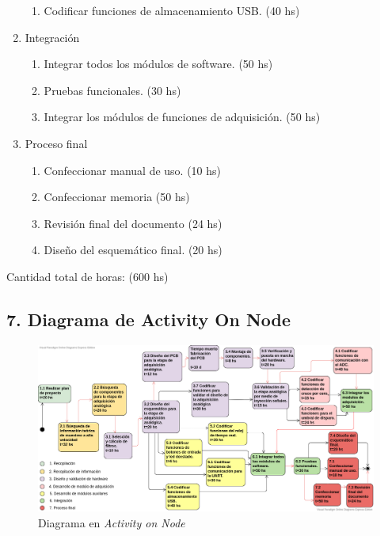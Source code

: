 \documentclass[11pt]{charter}
\begin{document}
\begin{enumerate}
\begin{enumerate}
	\item Codificar funciones de almacenamiento USB. (40 hs)
	\end{enumerate}
\item Integración
	\begin{enumerate}
	\item Integrar todos los módulos de software. (50 hs) 	
	\item Pruebas funcionales.	(30 hs)
	\item Integrar los módulos de funciones de adquisición. (50 hs)
	\end{enumerate}
\item Proceso final
	\begin{enumerate}
	\item Confeccionar manual de uso. (10 hs) 	
	\item Confeccionar memoria (50 hs)
	\item Revisión final del documento (24 hs)
	\item Diseño del esquemático final.	(20 hs)
	\end{enumerate}
\end{enumerate}

Cantidad total de horas: (600 hs)


\begin{landscape}

\section{7. Diagrama de Activity On Node}
\label{sec:AoN}

\begin{figure}[H]
\centering 
\includegraphics[width=1.5\textwidth]{./Figuras/AON.png}
\caption{Diagrama en \textit{Activity on Node}}
\label{fig:AoN}
\end{figure}
\end{landscape}
\end{document}
